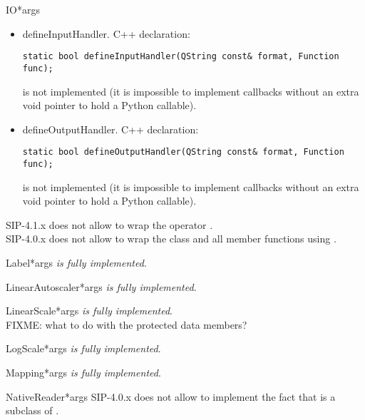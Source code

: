 \documentclass{manual}
\begin{document}
\begin{classdesc}{IO}{*args}
  \begin{itemize}
  \item{defineInputHandler}. C++ declaration:
\begin{verbatim}
static bool defineInputHandler(QString const& format, Function func);
\end{verbatim}
    is not implemented (it is impossible to implement callbacks without an
    extra void pointer to hold a Python callable).
  \item{defineOutputHandler}. C++ declaration:
\begin{verbatim}
static bool defineOutputHandler(QString const& format, Function func);
\end{verbatim}
    is not implemented (it is impossible to implement callbacks without an
    extra void pointer to hold a Python callable).
  \end{itemize}
  SIP-4.1.x does not allow to wrap the operator
  .\\
  SIP-4.0.x does not allow to wrap the class  and all member
  functions using .
\end{classdesc}

\begin{classdesc}{Label}{*args}
\emph{is fully implemented}.
\end{classdesc}

\begin{classdesc}{LinearAutoscaler}{*args}
\emph{is fully implemented}.
\end{classdesc}

\begin{classdesc}{LinearScale}{*args}
\emph{is fully implemented}.\\
FIXME: what to do with the protected data members?
\end{classdesc}

\begin{classdesc}{LogScale}{*args}
\emph{is fully implemented}.
\end{classdesc}

\begin{classdesc}{Mapping}{*args}
\emph{is fully implemented}.
\end{classdesc}

\begin{classdesc}{NativeReader}{*args}
SIP-4.0.x does not allow to implement the fact that  is a
subclass of .
\end{classdesc}
\end{document}
